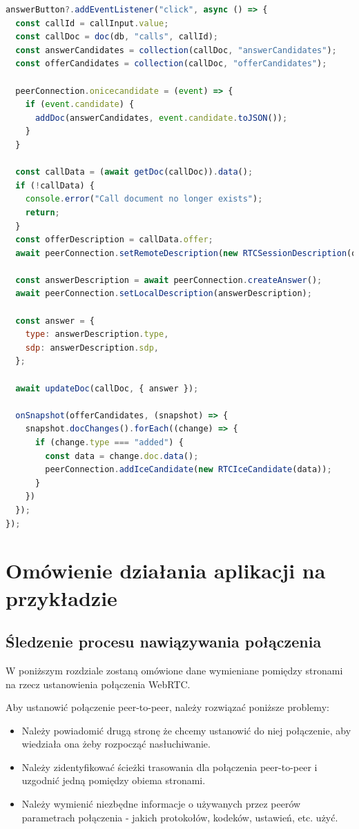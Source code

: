 \begin{lstlisting}[language=Javascript,label=list:call-join, caption=Dołączanie do połączenia połączenia,
basicstyle=\footnotesize \ttfamily, showtabs=true, tabsize=4]
answerButton?.addEventListener("click", async () => {
  const callId = callInput.value;
  const callDoc = doc(db, "calls", callId);
  const answerCandidates = collection(callDoc, "answerCandidates");
  const offerCandidates = collection(callDoc, "offerCandidates");

  peerConnection.onicecandidate = (event) => {
    if (event.candidate) {
      addDoc(answerCandidates, event.candidate.toJSON());
    }
  }

  const callData = (await getDoc(callDoc)).data();
  if (!callData) {
    console.error("Call document no longer exists");
    return;
  }
  const offerDescription = callData.offer;
  await peerConnection.setRemoteDescription(new RTCSessionDescription(offerDescription));

  const answerDescription = await peerConnection.createAnswer();
  await peerConnection.setLocalDescription(answerDescription);

  const answer = {
    type: answerDescription.type,
    sdp: answerDescription.sdp,
  };

  await updateDoc(callDoc, { answer });

  onSnapshot(offerCandidates, (snapshot) => {
    snapshot.docChanges().forEach((change) => {
      if (change.type === "added") {
        const data = change.doc.data();
        peerConnection.addIceCandidate(new RTCIceCandidate(data));
      }
    })
  });
});
\end{lstlisting}

\section{Omówienie działania aplikacji na przykładzie}
\subsection{Śledzenie procesu nawiązywania połączenia}

W poniższym rozdziale zostaną omówione dane wymieniane pomiędzy stronami na rzecz ustanowienia połączenia WebRTC.


Aby ustanowić połączenie peer-to-peer, należy rozwiązać poniższe problemy: \cite{hpbn}

\begin{itemize}
  \item Należy powiadomić drugą stronę że chcemy ustanowić do niej połączenie, aby wiedziała ona żeby rozpocząć
        nasłuchiwanie.
  \item Należy zidentyfikować ścieżki trasowania dla połączenia peer-to-peer i uzgodnić jedną pomiędzy obiema stronami.
  \item Należy wymienić niezbędne informacje o używanych przez peerów parametrach połączenia - jakich protokołów,
        kodeków, ustawień, etc. użyć.
\end{itemize}

